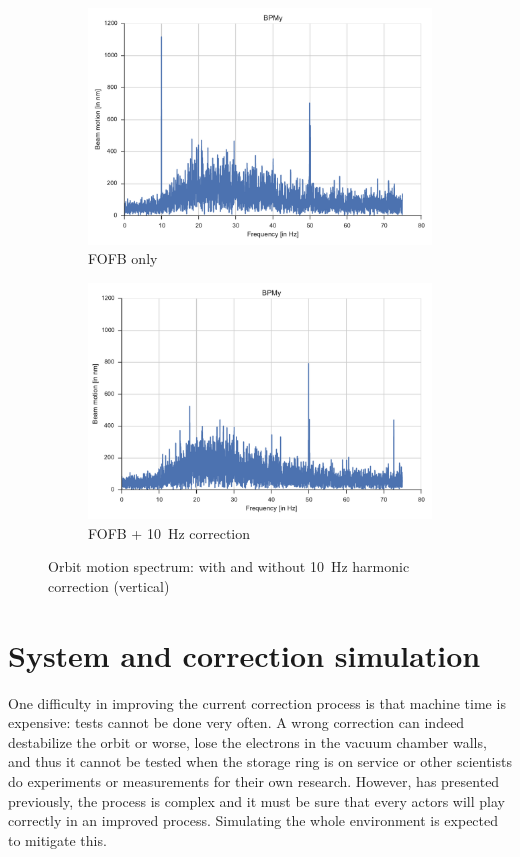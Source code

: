 \begin{figure}
    \centering
    \begin{subfigure}[b]{0.8\textwidth}
        \includegraphics[width=\linewidth]{img/fft_fofb_low}
        \caption{FOFB only}
    \end{subfigure}
    \begin{subfigure}[b]{0.8\textwidth}
    \includegraphics[width=\linewidth]{img/fft_fofb_dyn_low}
    \caption{FOFB + \SI{10}{\hertz} correction}
    \end{subfigure}
    \caption{\label{fig:compare_dyn_corr}Orbit motion spectrum: with and without \SI{10}{\hertz} harmonic correction (vertical)}
\end{figure}


\section{System and correction simulation}
One difficulty in improving the current correction process is that machine time is expensive: tests cannot be done very often. A wrong correction can indeed destabilize the orbit or worse, lose the electrons in the vacuum chamber walls, and thus it cannot be tested when the storage ring is on service or other scientists do experiments or measurements for their own research. However, has presented previously, the process is complex and it must be sure that every actors will play correctly in an improved process. Simulating the whole environment is expected to mitigate this.

